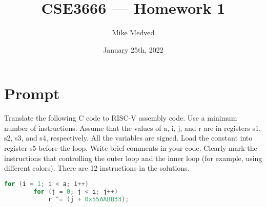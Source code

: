 \documentclass{article}
\title{CSE3666 — Homework 1}
\author{Mike Medved}
\date{January 25th, 2022}
\begin{document}
\maketitle

\section{Prompt}
Translate the following C code to RISC-V assembly code. Use a minimum number of
instructions. Assume that the values of a, i, j, and r are in registers s1, s2, s3, and s4,
respectively. All the variables are signed. Load the constant into register s5 before the loop.
Write brief comments in your code. Clearly mark the instructions that controlling the outer
loop and the inner loop (for example, using different colors). There are 12 instructions in the
solutions.

\hfill
\begin{lstlisting}[language=C]
    for (i = 1; i < a; i++) 
        for (j = 0; j < i; j++) 
            r ^= (j + 0x55AABB33);
\end{lstlisting}
\end{document}
